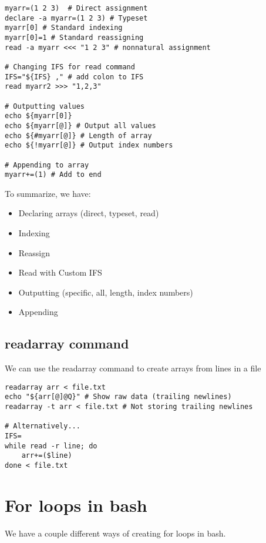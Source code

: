 \documentclass{report}
\begin{document}
    \begin{verbatim}
myarr=(1 2 3)  # Direct assignment
declare -a myarr=(1 2 3) # Typeset
myarr[0] # Standard indexing
myarr[0]=1 # Standard reassigning
read -a myarr <<< "1 2 3" # nonnatural assignment

# Changing IFS for read command
IFS="${IFS} ," # add colon to IFS
read myarr2 >>> "1,2,3"

# Outputting values
echo ${myarr[0]}
echo ${myarr[@]} # Output all values
echo ${#myarr[@]} # Length of array
echo ${!myarr[@]} # Output index numbers

# Appending to array
myarr+=(1) # Add to end
    \end{verbatim}
    \bigbreak \noindent
    
    \bigbreak \noindent 
    To summarize, we have:
    \begin{itemize}
        \item Declaring arrays (direct, typeset, read)
        \item Indexing
        \item Reassign
        \item  Read with Custom IFS
        \item Outputting (specific, all, length, index numbers)
        \item Appending
    \end{itemize}

    \pagebreak \bigbreak \noindent 
    \subsection{readarray command}
    \bigbreak \noindent 
    We can use the readarray command to create arrays from lines in a file
    
    \begin{verbatim}
readarray arr < file.txt
echo "${arr[@]@Q}" # Show raw data (trailing newlines)
readarray -t arr < file.txt # Not storing trailing newlines

# Alternatively...
IFS=
while read -r line; do
    arr+=($line)
done < file.txt
    \end{verbatim}
    \bigbreak \noindent
    
    
    \pagebreak \bigbreak \noindent 
    \section{\LARGE For loops in bash}
    \bigbreak \noindent 
    We have a couple different ways of creating for loops in bash.
    \bigbreak \noindent 
\end{document}
